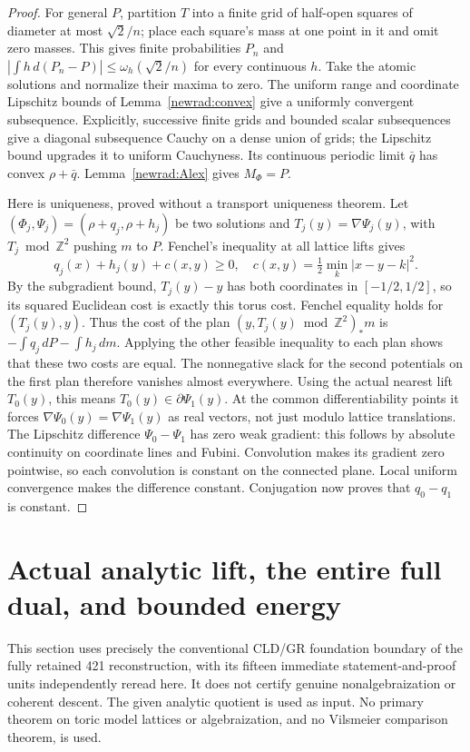 \documentclass[11pt]{article}
\begin{document}
\begin{proof}
For general $P$, partition $T$ into a finite grid of half-open squares
of diameter at most $\sqrt2/n$; place each square's mass at one point
in it and omit zero masses. This gives finite probabilities $P_n$ and
$|\int h\,d(P_n-P)|\le\omega_h(\sqrt2/n)$ for every continuous $h$.
Take the atomic solutions and normalize their maxima to zero. The
uniform range and coordinate Lipschitz bounds of Lemma~\ref{newrad:convex}
give a uniformly convergent subsequence. Explicitly, successive finite
grids and bounded scalar subsequences give a diagonal subsequence
Cauchy on a dense union of grids; the Lipschitz bound upgrades it to
uniform Cauchyness. Its continuous periodic limit $\bar q$ has convex
$\rho+\bar q$. Lemma~\ref{newrad:Alex} gives $M_\Phi=P$.

Here is uniqueness, proved without a transport uniqueness theorem.
Let $(\Phi_j,\Psi_j)=(\rho+q_j,\rho+h_j)$ be two solutions and
$T_j(y)=\nabla\Psi_j(y)$, with $T_j\bmod\mathbb Z^2$ pushing $m$
to $P$. Fenchel's inequality at all lattice lifts gives
\[
 q_j(x)+h_j(y)+c(x,y)\ge0,
 \quad c(x,y)=\tfrac12\min_k|x-y-k|^2.
\]
By the subgradient bound, $T_j(y)-y$ has both coordinates in
$[-1/2,1/2]$, so its squared Euclidean cost is exactly this torus
cost. Fenchel equality holds for $(T_j(y),y)$. Thus the cost of the
plan $(y,T_j(y)\bmod\mathbb Z^2)_*m$ is
$-\int q_j\,dP-\int h_j\,dm$. Applying the other feasible
inequality to each plan shows that these two costs are equal.
The nonnegative slack for the second potentials on the first plan
therefore vanishes almost everywhere. Using the actual nearest lift
$T_0(y)$, this means $T_0(y)\in\partial\Psi_1(y)$.
At the common differentiability points it forces
$\nabla\Psi_0(y)=\nabla\Psi_1(y)$ as real vectors, not just modulo
lattice translations. The Lipschitz difference $\Psi_0-\Psi_1$ has
zero weak gradient: this follows by absolute continuity on coordinate
lines and Fubini. Convolution makes its gradient zero pointwise, so
each convolution is constant on the connected plane. Local uniform
convergence makes the difference constant. Conjugation now proves
that $q_0-q_1$ is constant.
\end{proof}

\section{Actual analytic lift, the entire full dual, and bounded energy}
This section uses precisely the conventional CLD/GR foundation boundary
of the fully retained 421 reconstruction, with its fifteen immediate
statement-and-proof units independently reread here. It does not certify
genuine nonalgebraization or coherent descent. The given analytic quotient
is used as input. No primary theorem on toric model lattices or
algebraization, and no Vilsmeier comparison theorem, is used.
\end{document}
